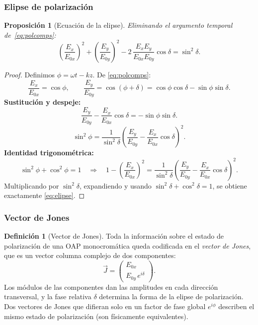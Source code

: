 \documentclass[12pt, a4paper]{article}
\theoremstyle{plain}
\newtheorem{proposicion}[teorema]{Proposición}
\theoremstyle{definition}
\newtheorem{definicion}[teorema]{Definición}
\theoremstyle{remark}
\newcommand{\ve}[1]{\vec{#1}}
\begin{document}
\subsubsection{Elipse de polarización}

\begin{proposicion}[Ecuación de la elipse]
Eliminando el argumento temporal de~\eqref{eq:polcomps}:
\begin{equation}
  \left(\frac{E_x}{E_{0x}}\right)^{\!2}
  + \left(\frac{E_y}{E_{0y}}\right)^{\!2}
  - 2\,\frac{E_x E_y}{E_{0x}E_{0y}}\cos\delta
  = \sin^2\!\delta. \label{eq:elipse}
\end{equation}
\end{proposicion}

\begin{proof}
Definimos $\phi=\omega t-kz$. De \eqref{eq:polcomps}:
\[
  \frac{E_x}{E_{0x}}=\cos\phi,
  \qquad
  \frac{E_y}{E_{0y}}=\cos(\phi+\delta)
  =\cos\phi\cos\delta-\sin\phi\sin\delta.
\]
\textbf{Sustitución y despeje:}
\[
  \frac{E_y}{E_{0y}}-\frac{E_x}{E_{0x}}\cos\delta
  =-\sin\phi\sin\delta.
\]
\[
  \sin^2\phi
  =\frac{1}{\sin^2\delta}
   \left(
     \frac{E_y}{E_{0y}}-\frac{E_x}{E_{0x}}\cos\delta
   \right)^2.
\]
\textbf{Identidad trigonométrica:}
\[
  \sin^2\phi+\cos^2\phi=1
  \quad\Longrightarrow\quad
  1-\left(\frac{E_x}{E_{0x}}\right)^2
  =\frac{1}{\sin^2\delta}
   \left(
     \frac{E_y}{E_{0y}}-\frac{E_x}{E_{0x}}\cos\delta
   \right)^2.
\]
Multiplicando por $\sin^2\delta$, expandiendo y usando
$\sin^2\delta+\cos^2\delta=1$, se obtiene exactamente
\eqref{eq:elipse}.
\end{proof}

\subsubsection{Vector de Jones}

\begin{definicion}[Vector de Jones]
Toda la información sobre el estado de polarización de una OAP monocromática
queda codificada en el \emph{vector de Jones}, que es un vector columna complejo
de dos componentes:
\begin{equation}
  \ve{J} = \begin{pmatrix}E_{0x}\\E_{0y}\,e^{i\delta}\end{pmatrix}.
  \label{eq:jones}
\end{equation}
Los módulos de las componentes dan las amplitudes en cada dirección transversal,
y la fase relativa $\delta$ determina la forma de la elipse de polarización.
Dos vectores de Jones que difieran solo en un factor de fase global $e^{i\phi}$
describen el mismo estado de polarización (son físicamente equivalentes).
\end{definicion}
\end{document}
